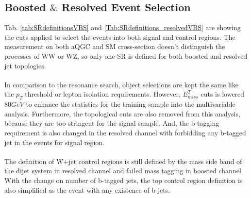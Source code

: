 \subsection{Boosted $\&$ Resolved Event Selection}
Tab. \ref{tab:SRdefinitionsVBS} and \ref{Tab:SRdefinitions_resolvedVBS} are showing the cuts applied to select the events into both signal and control regions. The measurement on both aQGC and SM cross-section doesn't distinguish the processes of WW or WZ, so only one SR is defined for both boosted and resolved jet topologies.
\\
\\In comparison to the resonance search, object selections are kept the same like the $p_{T}$ threshold or lepton isolation requirements. However, $E^{T}_{miss}$ cuts is lowered $80GeV$ to enhance the statistics for the training sample into the multivariable analysis. Furthermore, the topological cuts are also removed from this analysis, because they are too stringent for the signal sample. And, the b-tagging requirement is also changed in the resolved channel with forbidding any b-tagged jet in the events for signal region. 
\\
\\The definition of W+jet control regions is still defined by the mass side band of the dijet system in resolved channel and failed mass tagging in boosted channel. With the change on number of b-tagged jets, the top control region definition is also simplified as the event with any existence of b-jets.  
